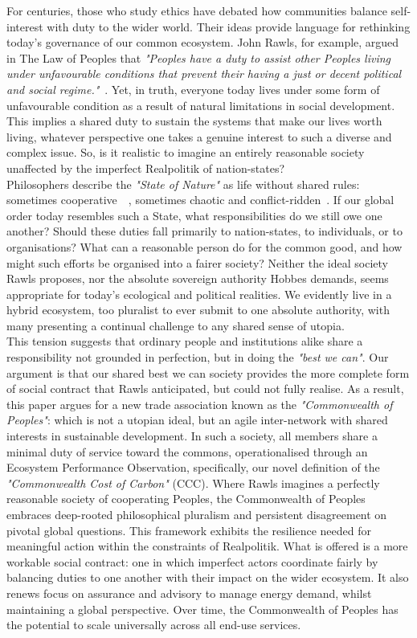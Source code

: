 \documentclass[12pt, oneside]{article}   	%
\begin{document}
For centuries, those who study ethics have debated how communities balance self-interest with duty to the wider world.
Their ideas provide language for rethinking today’s governance of our common ecosystem.
John Rawls, for example, argued in The Law of Peoples that \emph{"Peoples have a duty to assist other Peoples living under unfavourable conditions that prevent their having a just or decent political and social regime."}~\cite{jr2}.
Yet, in truth, everyone today lives under some form of unfavourable condition as a result of natural limitations in social development.
This implies a shared duty to sustain the systems that make our lives worth living, whatever perspective one takes a genuine interest to such a diverse and complex issue.
So, is it realistic to imagine an entirely reasonable society unaffected by the imperfect Realpolitik of nation-states?\\

Philosophers describe the \emph{"State of Nature"} as life without shared rules: sometimes cooperative~\cite{jl1}~\cite{rn1}, sometimes chaotic and conflict-ridden~\cite{th1}.
If our global order today resembles such a State, what responsibilities do we still owe one another?
Should these duties fall primarily to nation-states, to individuals, or to organisations?
What can a reasonable person do for the common good, and how might such efforts be organised into a fairer society?
Neither the ideal society Rawls proposes, nor the absolute sovereign authority Hobbes demands, seems appropriate for today’s ecological and political realities.
We evidently live in a hybrid ecosystem, too pluralist to ever submit to one absolute authority, with many presenting a continual challenge to any shared sense of utopia.\\

This tension suggests that ordinary people and institutions alike share a responsibility not grounded in perfection, but in doing the \emph{"best we can"}.
Our argument is that our shared best we can society provides the more complete form of social contract that Rawls anticipated, but could not fully realise.
As a result, this paper argues for a new trade association known as the \emph{"Commonwealth of Peoples"}: which is not a utopian ideal, but an agile inter-network with shared interests in sustainable development.
In such a society, all members share a minimal duty of service toward the commons, operationalised through an Ecosystem Performance Observation, specifically, our novel definition of the \emph{"Commonwealth Cost of Carbon"} (CCC).
Where Rawls imagines a perfectly reasonable society of cooperating Peoples, the Commonwealth of Peoples embraces deep-rooted philosophical pluralism and persistent disagreement on pivotal global questions.
This framework exhibits the resilience needed for meaningful action within the constraints of Realpolitik.
What is offered is a more workable social contract: one in which imperfect actors coordinate fairly by balancing duties to one another with their impact on the wider ecosystem.
It also renews focus on assurance and advisory to manage energy demand, whilst maintaining a global perspective.
Over time, the Commonwealth of Peoples has the potential to scale universally across all end-use services.\\
\end{document}
